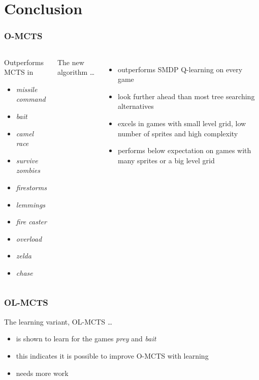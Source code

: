 \documentclass[aspectratio=169]{beamer}
\begin{document}
\section{Conclusion}
\begin{frame}
	\frametitle{O-MCTS}
	\begin{columns}
		\begin{block}{Outperforms MCTS in}
			\begin{itemize}
				\item \textit{missile command}
				\item \textit{bait}
				\item \textit{camel race}
				\item \textit{survive zombies}
				\item \textit{firestorms}
				\item \textit{lemmings}
				\item \textit{fire caster}
				\item \textit{overload}
				\item \textit{zelda}
				\item \textit{chase}
			\end{itemize}
		\end{block}
		The new algorithm \ldots
			\begin{itemize}
				\item outperforms SMDP Q-learning on every game 
				\item look further ahead than most tree searching alternatives
				\item excels in games with small level grid, low number of
					sprites and high complexity
				\item performs below expectation on games with many sprites or a
					big level grid
			\end{itemize}
	\end{columns}
\end{frame}

\begin{frame}
	\frametitle{OL-MCTS}
	The learning variant, OL-MCTS \ldots
	\begin{itemize}
		\item is shown to learn for the games \textit{prey} and \textit{bait}
		\item this indicates it is possible to improve O-MCTS with learning
		\item needs more work
	\end{itemize}
\end{frame}
\end{document}
